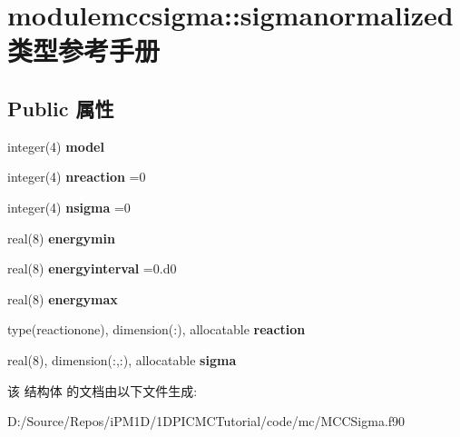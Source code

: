 \hypertarget{structmodulemccsigma_1_1sigmanormalized}{}\section{modulemccsigma\+::sigmanormalized 类型参考手册}
\label{structmodulemccsigma_1_1sigmanormalized}
\subsection*{Public 属性}
\begin{DoxyCompactItemize}
\item 
\mbox{\label{structmodulemccsigma_1_1sigmanormalized_a30f2024e6c466d59366b8771a6307a06}} 
integer(4) {\bfseries model}
\item 
\mbox{\label{structmodulemccsigma_1_1sigmanormalized_a78109db4081b3a5a3da8cc8b2fd8201c}} 
integer(4) {\bfseries nreaction} =0
\item 
\mbox{\label{structmodulemccsigma_1_1sigmanormalized_af317727e63f5bcb100859aea8b05f5a8}} 
integer(4) {\bfseries nsigma} =0
\item 
\mbox{\label{structmodulemccsigma_1_1sigmanormalized_a7f9eecf40a158a10e93acbcec8e5fcb5}} 
real(8) {\bfseries energymin}
\item 
\mbox{\label{structmodulemccsigma_1_1sigmanormalized_a6630a50a02fd5a86ef15aed460838a88}} 
real(8) {\bfseries energyinterval} =0.d0
\item 
\mbox{\label{structmodulemccsigma_1_1sigmanormalized_a4fb0e490217cd34bd6857434acfc1713}} 
real(8) {\bfseries energymax}
\item 
\mbox{\label{structmodulemccsigma_1_1sigmanormalized_a928f3ecd90fa87d366b54702cfbb99a0}} 
type(reactionone), dimension(\+:), allocatable {\bfseries reaction}
\item 
\mbox{\label{structmodulemccsigma_1_1sigmanormalized_ac4ad25d6fdbe1290a5a1135b3960424e}} 
real(8), dimension(\+:,\+:), allocatable {\bfseries sigma}
\end{DoxyCompactItemize}


该 结构体 的文档由以下文件生成\+:\begin{DoxyCompactItemize}
\item 
D\+:/\+Source/\+Repos/i\+P\+M1\+D/1\+D\+P\+I\+C\+M\+C\+Tutorial/code/mc/M\+C\+C\+Sigma.\+f90\end{DoxyCompactItemize}
